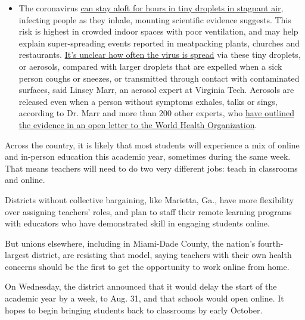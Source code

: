 \begin{itemize}
  \begin{itemize}
  \tightlist
  \item
    The coronavirus
    \href{https://www.nytimes.com/2020/07/04/health/239-experts-with-one-big-claim-the-coronavirus-is-airborne.html?action=click\&pgtype=Article\&state=default\&region=MAIN_CONTENT_3\&context=storylines_faq}{can
    stay aloft for hours in tiny droplets in stagnant air}, infecting
    people as they inhale, mounting scientific evidence suggests. This
    risk is highest in crowded indoor spaces with poor ventilation, and
    may help explain super-spreading events reported in meatpacking
    plants, churches and restaurants.
    \href{https://www.nytimes.com/2020/07/06/health/coronavirus-airborne-aerosols.html?action=click\&pgtype=Article\&state=default\&region=MAIN_CONTENT_3\&context=storylines_faq}{It's
    unclear how often the virus is spread} via these tiny droplets, or
    aerosols, compared with larger droplets that are expelled when a
    sick person coughs or sneezes, or transmitted through contact with
    contaminated surfaces, said Linsey Marr, an aerosol expert at
    Virginia Tech. Aerosols are released even when a person without
    symptoms exhales, talks or sings, according to Dr. Marr and more
    than 200 other experts, who
    \href{https://academic.oup.com/cid/article/doi/10.1093/cid/ciaa939/5867798}{have
    outlined the evidence in an open letter to the World Health
    Organization}.
  \end{itemize}
\end{itemize}

Across the country, it is likely that most students will experience a
mix of online and in-person education this academic year, sometimes
during the same week. That means teachers will need to do two very
different jobs: teach in classrooms and online.

Districts without collective bargaining, like Marietta, Ga., have more
flexibility over assigning teachers' roles, and plan to staff their
remote learning programs with educators who have demonstrated skill in
engaging students online.

But unions elsewhere, including in Miami-Dade County, the nation's
fourth-largest district, are resisting that model, saying teachers with
their own health concerns should be the first to get the opportunity to
work online from home.

On Wednesday, the district announced that it would delay the start of
the academic year by a week, to Aug. 31, and that schools would open
online. It hopes to begin bringing students back to classrooms by early
October.

